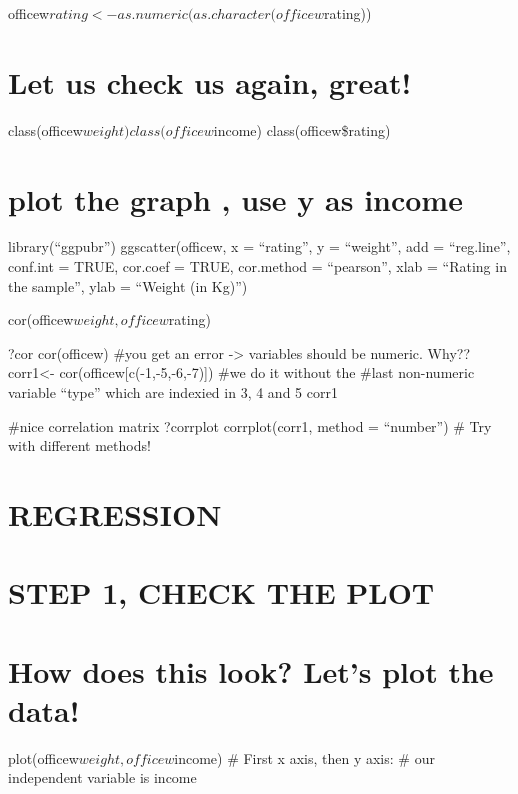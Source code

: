 \documentclass[
]{article}
\begin{document}
officew\(rating <- as.numeric(as.character(officew\)rating))

\hypertarget{let-us-check-us-again-great-1}{%
\section{Let us check us again,
great!}\label{let-us-check-us-again-great-1}}

class(officew\(weight) class(officew\)income) class(officew\$rating)

\hypertarget{plot-the-graph-use-y-as-income}{%
\section{plot the graph , use y as
income}\label{plot-the-graph-use-y-as-income}}

library(``ggpubr'') ggscatter(officew, x = ``rating'', y = ``weight'',
add = ``reg.line'', conf.int = TRUE, cor.coef = TRUE, cor.method =
``pearson'', xlab = ``Rating in the sample'', ylab = ``Weight (in Kg)'')

cor(officew\(weight,officew\)rating)

?cor cor(officew) \#you get an error -\textgreater{} variables should be
numeric. Why?? corr1\textless- cor(officew{[}c(-1,-5,-6,-7){]}) \#we do
it without the \#last non-numeric variable ``type'' which are indexied
in 3, 4 and 5 corr1

\#nice correlation matrix ?corrplot corrplot(corr1, method = ``number'')
\# Try with different methods!

\hypertarget{regression}{%
\section{REGRESSION}\label{regression}}

\hypertarget{step-1-check-the-plot}{%
\section{STEP 1, CHECK THE PLOT}\label{step-1-check-the-plot}}

\hypertarget{how-does-this-look-lets-plot-the-data}{%
\section{How does this look? Let's plot the
data!}\label{how-does-this-look-lets-plot-the-data}}

plot(officew\(weight, officew\)income) \# First x axis, then y axis: \#
our independent variable is income
\end{document}
